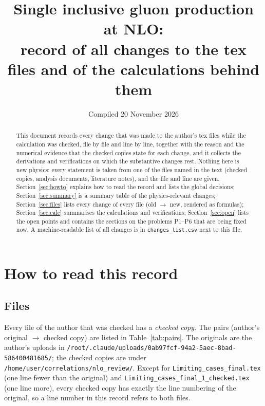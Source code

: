 \documentclass[10pt]{article}
\begin{document}
\title{Single inclusive gluon production at NLO:\\ record of all changes to the tex files and of the calculations behind them}
\author{}
\date{Compiled 20 November 2026}
\maketitle

\begin{abstract}
\noindent This document records every change that was made to the author's tex files while the calculation was checked, file by file and line by line, together with the reason and the numerical evidence that the checked copies state for each change, and it collects the derivations and verifications on which the substantive changes rest. Nothing here is new physics: every statement is taken from one of the files named in the text (checked copies, analysis documents, literature notes), and the file and line are given. Section~\ref{sec:howto} explains how to read the record and lists the global decisions; Section~\ref{sec:summary} is a summary table of the physics-relevant changes; Section~\ref{sec:files} lists every change of every file (old $\to$ new, rendered as formulas); Section~\ref{sec:calc} summarises the calculations and verifications; Section~\ref{sec:open} lists the open points and contains the sections on the problems P1--P6 that are being fixed now. A machine-readable list of all changes is in \texttt{changes\_list.csv} next to this file.
\end{abstract}

\tableofcontents
\clearpage

\setcounter{section}{-1}
\section{How to read this record}\label{sec:howto}

\subsection{Files}
\noindent Every file of the author that was checked has a \emph{checked copy}. The pairs (author's original $\to$ checked copy) are listed in Table~\ref{tab:pairs}. The originals are the author's uploads in \texttt{/root/.claude/uploads/0ab97fcf-94a2-5aec-8bad-586400481685/}; the checked copies are under \texttt{/home/user/correlations/nlo\_review/}. Except for \texttt{Limiting\_cases\_final.tex} (one line fewer than the original) and \texttt{Limiting\_cases\_final\_1\_checked.tex} (one line more), every checked copy has exactly the line numbering of the original, so a line number in this record refers to both files.
\end{document}

